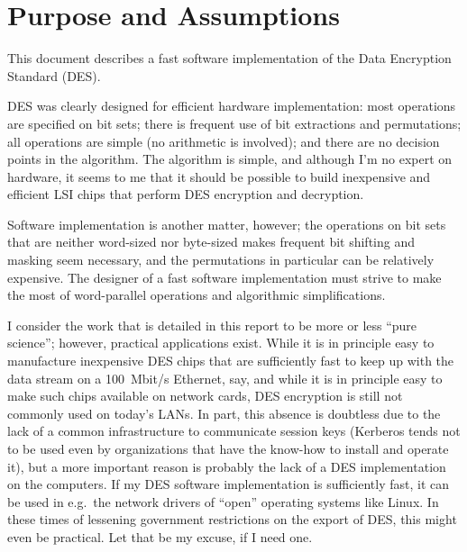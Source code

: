 

\topmargin      -1.0cm
\oddsidemargin   1.0cm
\evensidemargin  1.0cm
\textwidth       5.7in
\textheight      9.0in



\newcommand{\ipinv}{$\mbox{IP}^{-1}$}


\section{Purpose and Assumptions}

This document describes a fast software implementation of the Data
Encryption Standard (DES).

DES was clearly designed for efficient hardware implementation: most
operations are specified on bit sets; there is frequent use of bit
extractions and permutations; all operations are simple (no arithmetic
is involved); and there are no decision points in the algorithm.  The
algorithm is simple, and although I'm no expert on hardware, it seems
to me that it should be possible to build inexpensive and efficient
LSI chips that perform DES encryption and decryption.

Software implementation is another matter, however; the operations on
bit sets that are neither word-sized nor byte-sized makes frequent bit
shifting and masking seem necessary, and the permutations in
particular can be relatively expensive.  The designer of a
fast software implementation must strive to make the most
of word-parallel operations and algorithmic simplifications.

I consider the work that is detailed in this report to be more or less
``pure science''; however, practical applications exist.  While it is
in principle easy to manufacture inexpensive DES chips that are
sufficiently fast to keep up with the data stream on a 100~Mbit/s
Ethernet, say, and while it is in principle easy to make such chips
available on network cards, DES encryption is still not commonly 
used on today's LANs.  In part, this absence
is doubtless due to the lack of a common infrastructure to communicate
session keys (Kerberos tends not to be used even by organizations that
have the know-how to install and operate it), but a more important
reason is probably the lack of a DES implementation on the computers.
If my DES software implementation is sufficiently fast, it can be used
in e.g.~the network drivers of ``open'' operating systems like Linux.
In these times of lessening government restrictions on the export of
DES, this might even be practical.  Let that be my excuse, if
I need one.

